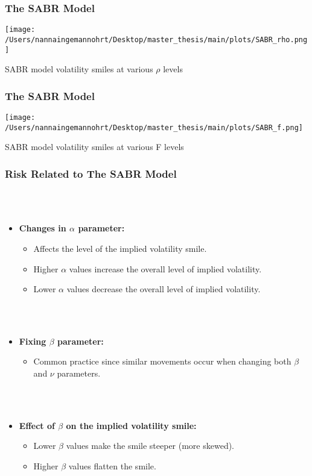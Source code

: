 \documentclass{beamer}
\begin{document}
\begin{frame}
    \frametitle{\textcolor{KUrod}{The SABR Model}}
    \centering
    \texttt{[image: /Users/nannaingemannohrt/Desktop/master\_thesis/main/plots/SABR\_rho.png]}
    \caption{SABR model volatility smiles at various $\rho$ levels}
\end{frame}

\begin{frame}
    \frametitle{\textcolor{KUrod}{The SABR Model}}
    \centering
    \texttt{[image: /Users/nannaingemannohrt/Desktop/master\_thesis/main/plots/SABR\_f.png]}
    \caption{SABR model volatility smiles at various F levels}
\end{frame}

\begin{frame}
    \frametitle{\textcolor{KUrod}{Risk Related to The SABR Model}}
    \\\\
    \begin{itemize}
        \item \textbf{Changes in $\alpha$ parameter:}
        \begin{itemize}[label=\textcolor{KUrod}{\textbullet}]
            \item Affects the level of the implied volatility smile.
            \item Higher $\alpha$ values increase the overall level of implied volatility.
            \item Lower $\alpha$ values decrease the overall level of implied volatility.
        \end{itemize}
    \\\\
        \item \textbf{Fixing $\beta$ parameter:}
        \begin{itemize}[label=\textcolor{KUrod}{\textbullet}]
            \item Common practice since similar movements occur when changing both $\beta$ and $\nu$ parameters.
        \end{itemize}
    \\\\
        \item \textbf{Effect of $\beta$ on the implied volatility smile:}
        \begin{itemize}[label=\textcolor{KUrod}{\textbullet}]
            \item Lower $\beta$ values make the smile steeper (more skewed).
            \item Higher $\beta$ values flatten the smile.
        \end{itemize}
    \end{itemize}
    
\end{frame}
\end{document}
